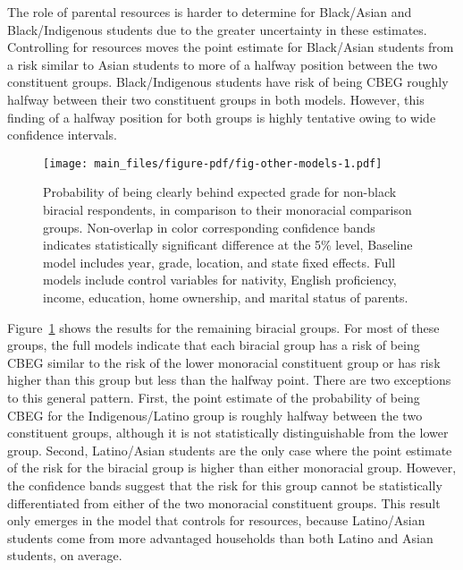\documentclass[
  12pt,
  letterpaper,
]{article}
\begin{document}
The role of parental resources is harder to determine for Black/Asian
and Black/Indigenous students due to the greater uncertainty in these
estimates. Controlling for resources moves the point estimate for
Black/Asian students from a risk similar to Asian students to more of a
halfway position between the two constituent groups. Black/Indigenous
students have risk of being CBEG roughly halfway between their two
constituent groups in both models. However, this finding of a halfway
position for both groups is highly tentative owing to wide confidence
intervals.

\begin{figure}[p]

{\centering \texttt{[image: main\_files/figure-pdf/fig-other-models-1.pdf]}

}

\caption{\label{fig-other-models}Probability of being clearly behind
expected grade for non-black biracial respondents, in comparison to
their monoracial comparison groups. Non-overlap in color corresponding
confidence bands indicates statistically significant difference at the
5\% level, Baseline model includes year, grade, location, and state
fixed effects. Full models include control variables for nativity,
English proficiency, income, education, home ownership, and marital
status of parents.}

\end{figure}

Figure~\ref{fig-other-models} shows the results for the remaining
biracial groups. For most of these groups, the full models indicate that
each biracial group has a risk of being CBEG similar to the risk of the
lower monoracial constituent group or has risk higher than this group
but less than the halfway point. There are two exceptions to this
general pattern. First, the point estimate of the probability of being
CBEG for the Indigenous/Latino group is roughly halfway between the two
constituent groups, although it is not statistically distinguishable
from the lower group. Second, Latino/Asian students are the only case
where the point estimate of the risk for the biracial group is higher
than either monoracial group. However, the confidence bands suggest that
the risk for this group cannot be statistically differentiated from
either of the two monoracial constituent groups. This result only
emerges in the model that controls for resources, because Latino/Asian
students come from more advantaged households than both Latino and Asian
students, on average.
\end{document}
